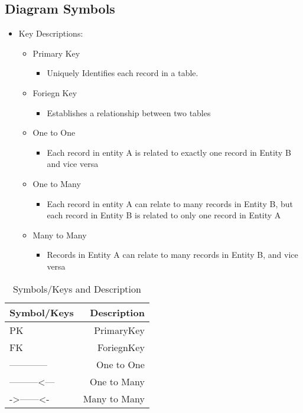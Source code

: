 \documentclass{article}
\begin{document}
\subsection{Diagram Symbols}
\begin{itemize}
\item Key Descriptions:
    \begin{itemize}
    \item Primary Key
    \begin{itemize}
        \item Uniquely Identifies each record in a table.
    \end{itemize}
    \item Foriegn Key
    \begin{itemize}
        \item Establishes a relationship between two tables
    \end{itemize}
    \item One to One
    \begin{itemize}
        \item Each record in entity A is related to exactly one record in Entity B and vice versa
    \end{itemize}
    \item One to Many
    \begin{itemize}
        \item Each record in entity A can relate to many records in Entity B, but each record in Entity B is related to only one record in Entity A
    \end{itemize}
    \item Many to Many
    \begin{itemize}
        \item Records in Entity A can relate to many records in Entity B, and vice versa
    \end{itemize}
    \end{itemize}
\end{itemize}

\begin{table}
\centering
\begin{tabular}{l|r}
Symbol/Keys & Description \\\hline
PK & PrimaryKey \\
FK & ForiegnKey\\
---\textbar{}------\textbar{}--- & One to One\\
---\textbar{}------\textless{}--- & One to Many\\
-\textgreater{}------\textless{}- & Many to Many
\end{tabular}
\caption{\label{tab:widgets}Symbols/Keys and Description}
\end{table}
\end{document}
